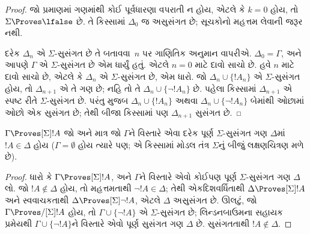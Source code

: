\documentclass[../../../include/open-logic-section]{subfiles}
\begin{document}
\begin{proof}
જો પ્રમાણમાં ગણમાંથી કોઈ પૂર્વધારણા વપરાતી ન હોય, એટલે કે
$k=0$ હોય, તો $\Sigma \Proves \lfalse$ છે. તે કિસ્સામાં
$\Delta_0$ જ અસુસંગત છે; સૂચકોનો મહત્તમ લેવાની જરૂર નથી.

દરેક $\Delta_n$ એ $\Sigma$-સુસંગત છે તે બતાવવા~$n$ પર ગાણિતિક અનુમાન
વાપરીએ. $\Delta_0 = \Gamma$, અને આપણે $\Gamma$ એ
$\Sigma$-સુસંગત છે એમ ધાર્યું હતું. એટલે $n = 0$ માટે દાવો સાચો
છે. હવે $n$ માટે દાવો સાચો છે, એટલે કે $\Delta_n$ એ
$\Sigma$-સુસંગત છે, એમ ધારો. જો $\Delta_n \cup \{!A_n\}$ એ
$\Sigma$-સુસંગત હોય, તો $\Delta_{n+1}$ એ તે ગણ છે; નહિ તો તે
$\Delta_n \cup \{\lnot!A_n\}$ છે. પહેલા કિસ્સામાં
$\Delta_{n+1}$ એ સ્પષ્ટ રીતે $\Sigma$-સુસંગત છે. પરંતુ
મુજબ $\Delta_n \cup \{!A_n\}$ અથવા $\Delta_n \cup \{\lnot!A_n\}$
બેમાંથી ઓછામાં ઓછો એક સુસંગત છે; તેથી બીજા કિસ્સામાં પણ
$\Delta_{n+1}$ સુસંગત છે.
\end{proof}


\begin{cor}
  $\Gamma \Proves[\Sigma] !A$ જો અને માત્ર જો $\Gamma$ને વિસ્તારે
  એવા દરેક પૂર્ણ $\Sigma$-સુસંગત ગણ $\Delta$માં $!A \in \Delta$
  હોય ($\Gamma = \emptyset$ હોય ત્યારે પણ; એ કિસ્સામાં મોડલ તંત્ર
  $\Sigma$નું બીજું લક્ષણચિત્રણ મળે છે).
\end{cor}

\begin{proof}
  ધારો કે $\Gamma \Proves[\Sigma] !A$, અને $\Gamma$ને વિસ્તારે
  એવો કોઈપણ પૂર્ણ $\Sigma$-સુસંગત ગણ $\Delta$ લો. જો $!A
  \notin \Delta$ હોય, તો મહત્તમતાથી $\lnot!A \in \Delta$;
  તેથી એકદિશવર્ધિતાથી $\Delta \Proves[\Sigma] !A$ અને સ્વવાચકતાથી
  $\Delta \Proves[\Sigma] \lnot!A$, એટલે $\Delta$ અસુસંગત છે.
  ઊલટું, જો $\Gamma \Proves/[\Sigma] !A$ હોય, તો $\Gamma \cup \{
  \lnot!A\}$ એ $\Sigma$-સુસંગત છે; લિન્ડનબાઉમના સહાયક પ્રમેયથી
  $\Gamma \cup \{ \lnot!A \}$ને વિસ્તારે એવો પૂર્ણ સુસંગત ગણ
  $\Delta$ છે. સુસંગતતાથી $!A \notin \Delta$.
\end{proof}
\end{document}
